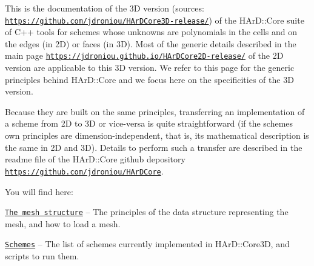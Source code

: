 This is the documentation of the 3D version (sources\+: \href{https://github.com/jdroniou/HArDCore3D-release/}{\tt https\+://github.\+com/jdroniou/\+H\+Ar\+D\+Core3\+D-\/release/}) of the H\+Ar\+D\+::\+Core suite of C++ tools for schemes whose unknowns are polynomials in the cells and on the edges (in 2D) or faces (in 3D). Most of the generic details described in the main page \href{https://jdroniou.github.io/HArDCore2D-release/}{\tt https\+://jdroniou.\+github.\+io/\+H\+Ar\+D\+Core2\+D-\/release/} of the 2D version are applicable to this 3D version. We refer to this page for the generic principles behind H\+Ar\+D\+::\+Core and we focus here on the specificities of the 3D version.

Because they are built on the same principles, transferring an implementation of a scheme from 2D to 3D or vice-\/versa is quite straightforward (if the scheme\textquotesingle{}s own principles are dimension-\/independent, that is, its mathematical description is the same in 2D and 3D). Details to perform such a transfer are described in the readme file of the H\+Ar\+D\+::\+Core github depository \href{https://github.com/jdroniou/HArDCore}{\tt https\+://github.\+com/jdroniou/\+H\+Ar\+D\+Core}.

You will find here\+:


\begin{DoxyItemize}
\item \href{#mesh}{\tt The mesh structure} -- The principles of the data structure representing the mesh, and how to load a mesh.
\item \href{#schemes}{\tt Schemes} -- The list of schemes currently implemented in H\+Ar\+D\+::\+Core3D, and scripts to run them.
\end{DoxyItemize}

